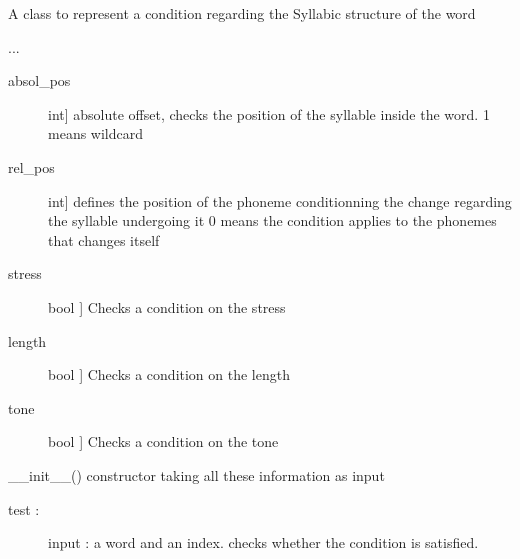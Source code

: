\documentclass[letterpaper,10pt,english]{sphinxmanual}
\begin{document}

\begin{fulllineitems}
\label{\detokenize{index:Condition.S_condition}}
\sphinxAtStartPar
A class to represent a condition regarding the Syllabic structure of the word

\sphinxAtStartPar
...
\begin{description}
\item[{absol\_pos}] \leavevmode{[}int{]}
\sphinxAtStartPar
absolute offset, checks the position of the syllable  inside the word.
\sphinxhyphen{}1 means wildcard

\item[{rel\_pos}] \leavevmode{[}int{]}
\sphinxAtStartPar
defines the position of the phoneme conditionning the change regarding the syllable undergoing it
0 means the condition applies to the phonemes that changes itself

\item[{stress}] \leavevmode{[}bool {]}
\sphinxAtStartPar
Checks a condition on the stress

\item[{length}] \leavevmode{[}bool {]}
\sphinxAtStartPar
Checks a condition on the length

\item[{tone}] \leavevmode{[}bool {]}
\sphinxAtStartPar
Checks a condition on the tone

\end{description}

\sphinxAtStartPar
\_\_init\_\_() constructor taking all these information as input
\begin{description}
\item[{test :}] \leavevmode
\sphinxAtStartPar
input : a word and an index.
checks whether the condition is satisfied.

\end{description}


\end{fulllineitems}
\end{document}

